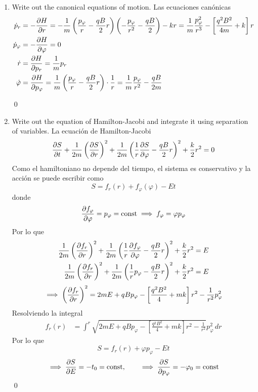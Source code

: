 \documentclass[]{article}
\numberwithin{equation}{section}
\begin{document}
\begin{enumerate}
	\qed
	
	\item[b.] Write out the canonical equations of motion.
	\resp Las ecuaciones canónicas
	\begin{align}
		\dot{p}_r &= - \dfrac{\partial H}{\partial r} = - \frac{1}{m} \left(\frac{p_\varphi}{r} - \frac{ q B}{2} r\right) \left(- \frac{p_\varphi}{r^2} - \frac{ q B}{2}\right) - k r = \frac{1}{m} \frac{p_\varphi^2}{r^3} - \left[\frac{q^2 B^2 }{4 m} + k\right] r\\
		\dot{p}_\varphi &= - \dfrac{\partial H}{\partial \varphi} = 0 \\
		\dot{r} &= \dfrac{\partial H}{\partial p_r} = \frac{1}{m} p_r\\
		\dot{\varphi} &= \dfrac{\partial H}{\partial p_\varphi} = \frac{1}{m} \left(\frac{p_\varphi}{r} - \frac{ q B}{2} r\right) \cdot \frac{1}{r} = \frac{1}{m} \frac{p_\varphi}{r^2} - \frac{ q B}{2 m}
	\end{align}
	
	\qed
	
	\item[c.] Write out the equation of Hamilton-Jacobi and integrate it using separation of variables.
	\resp La ecuación de Hamilton-Jacobi
	\begin{equation}
		\dfrac{\partial S}{\partial t} + \frac{1}{2 m} \left(\dfrac{\partial S}{\partial r}\right)^2 + \frac{1}{2 m} \left(\frac{1}{r} \dfrac{\partial S}{\partial \varphi} - \frac{ q B}{2} r\right)^2 + \frac{k}{2} r^2 = 0
	\end{equation}
	Como el hamiltoniano no depende del tiempo, el sistema es conservativo y la acción se puede escribir como
	\begin{equation}
		S = f_r(r) + f_\varphi(\varphi) - E t
	\end{equation}
	donde
	\begin{equation}
		\dfrac{\partial f_\varphi}{\partial \varphi} = p_\varphi = \mathrm{const} \implies f_\varphi = \varphi p_\varphi
	\end{equation}
	Por lo que
	\begin{align*}
		\frac{1}{2 m} \left(\dfrac{\partial f_r}{\partial r}\right)^2 + \frac{1}{2 m} \left(\frac{1}{r} \dfrac{\partial f_\varphi}{\partial \varphi} - \frac{ q B}{2} r\right)^2 + \frac{k}{2} r^2 = E\\
		\frac{1}{2 m} \left(\dfrac{\partial f_r}{\partial r}\right)^2 + \frac{1}{2 m} \left(\frac{1}{r}p_\varphi - \frac{ q B}{2} r\right)^2 + \frac{k}{2} r^2 = E
	\end{align*}
	\begin{equation*}
		\implies \left(\dfrac{\partial f_r}{\partial r}\right)^2 = 2 m E + q B p_\varphi - \left[\frac{ q^2 B^2}{4} + m k \right] r^2 - \frac{1}{r^2} p_\varphi^2
	\end{equation*}
	Resolviendo la integral
	\begin{align*}
		f_r(r) &= \int^r \sqrt{2 m E + q B p_\varphi - \left[\frac{ q^2 B^2}{4} + m k \right] r^2 - \frac{1}{r^2}} p_\varphi^2 \, dr
	\end{align*}
	Por lo que
	\begin{equation}
		S = f_r(r) + \varphi p_\varphi - E t
	\end{equation}
	\begin{equation}
		\implies \dfrac{\partial S}{\partial E} = - t_0 = \mathrm{const}, \qquad \implies \dfrac{\partial S}{\partial p_\varphi} = -\varphi_0 = \mathrm{const}
	\end{equation}
	\qed
	

\end{enumerate}
\end{document}

